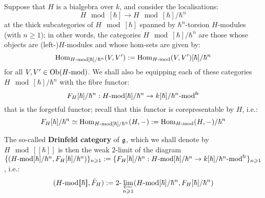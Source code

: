            \begin{definition} \label{def: drinfeld_categories_of_finite_type_bialgebras}
                Suppose that $H$ is a bialgebra over $k$, and consider the localisations:
                    $$H\mod[\hbar] \to H\mod[\hbar]/\hbar^n$$
                at the thick subcategories of $H\mod[\hbar]$ spanned by $\hbar^n$-torsion $H$-modules (with $n \geq 1$); in other words, the categories $H\mod[\hbar]/\hbar^n$ are those whose objects are (left-)$H$-modules and whose hom-sets are given by:
                    $$\Hom_{H\mod[\hbar]/\hbar^n}(V, V') := \Hom_{H\mod}(V, V')[\hbar]/\hbar^n$$
                for all $V, V' \in \Ob(H\mod)$. We shall also be equipping each of these categories $H\mod[\hbar]/\hbar^n$ with the fibre functor:
                    $$F_H[\hbar]/\hbar^n: H\mod[\hbar]/\hbar^n \to k[\hbar]/\hbar^n\mod^{\fr}$$
                that is the forgetful functor; recall that this functor is corepresentable by $H$, i.e.:
                    $$F_H[\hbar]/\hbar^n \cong \Hom_{H\mod[\hbar]/\hbar^n}(H, -) := \Hom_{H\mod}(H, -)/\hbar^n$$
                    
                The so-called \textbf{Drinfeld category} of $\g$, which we shall denote by $H\mod[\![\hbar]\!]$ is then the weak $2$-limit of the diagram $\{ ( H\mod[\hbar]/\hbar^n, F_H[\hbar]/\hbar^n ) \}_{n \geq 1} := \{ F_H[\hbar]/\hbar^n: H\mod[\hbar]/\hbar^n \to k[\hbar]/\hbar^n\mod^{\fr} \}_{n \geq 1}$, i.e.:
                    $$( H\mod[\![\hbar]\!], \hat{F}_H ) := 2\-\projlim_{n \geq 1} ( H\mod[\hbar]/\hbar^n, F_H[\hbar]/\hbar^n )$$
            \end{definition}
